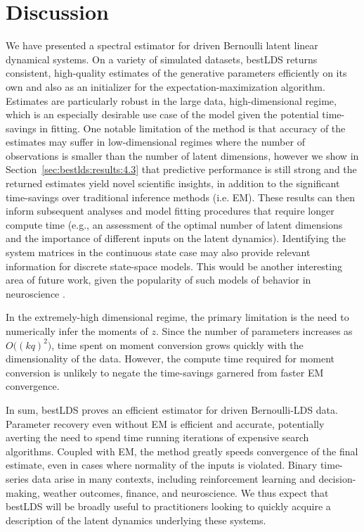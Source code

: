 \section{Discussion}
\label{sec:bestlds:discussion}

We have presented a spectral estimator for driven Bernoulli latent linear dynamical systems. On a variety of simulated datasets, bestLDS returns consistent, high-quality estimates of the generative parameters efficiently on its own and also as an initializer for the expectation-maximization algorithm. Estimates are particularly robust in the large data, high-dimensional regime, which is an especially desirable use case of the model given the potential time-savings in fitting. One notable limitation of the method is that accuracy of the estimates may suffer in low-dimensional regimes where the number of observations is smaller than the number of latent dimensions, however we show in Section~\ref{sec:bestlds:results:4.3} that predictive performance is still strong and the returned estimates yield novel scientific insights, in addition to the significant time-savings over traditional inference methods (i.e. EM). These results can then inform subsequent analyses and model fitting procedures that require longer compute time (e.g., an assessment of the optimal number of latent dimensions and the importance of different inputs on the latent dynamics). Identifying the system matrices in the continuous state case may also provide relevant information for discrete state-space models. This would be another interesting area of future work, given the popularity of such models of behavior in neuroscience \cite{bolkan_opponent_2022, ashwood_mice_2022}. 

In the extremely-high dimensional regime, the primary limitation is the need to numerically infer the moments of $z$. Since the number of parameters increases as $O\big((kq)^2\big)$, time spent on moment conversion grows quickly with the dimensionality of the data. However, the compute time required for moment conversion is unlikely to negate the time-savings garnered from faster EM convergence. 

In sum, bestLDS proves an efficient estimator for driven Bernoulli-LDS data. Parameter recovery even without EM is efficient and accurate, potentially averting the need to spend time running iterations of expensive search algorithms. Coupled with EM, the method greatly speeds convergence of the final estimate, even in cases where normality of the inputs is violated. Binary time-series data arise in many contexts, including reinforcement learning and decision-making, weather outcomes, finance, and neuroscience. We thus expect that bestLDS will be broadly useful to practitioners looking to quickly acquire a description of the latent dynamics underlying these systems.